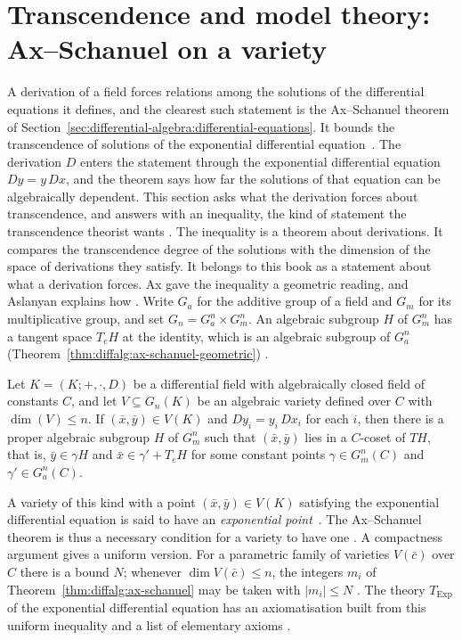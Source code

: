 \section{Transcendence and model theory: Ax--Schanuel on a variety}\label{sec:differential-algebra:transcendence}

A derivation of a field forces relations among the solutions of the differential
equations it defines, and the clearest such statement is the Ax--Schanuel
theorem of Section~\ref{sec:differential-algebra:differential-equations}. It
bounds the transcendence of solutions of the exponential differential equation~\cite[Theorem~2.2, p.~6]{Aslanyan2018}.
The derivation $D$ enters the statement through the exponential
differential equation $Dy=y\,Dx$, and the theorem says how far the solutions of
that equation can be algebraically dependent. This section asks what the
derivation forces about transcendence, and answers with an inequality, the kind
of statement the transcendence theorist wants
\cite[\S2]{Aslanyan2018}. The inequality is a theorem about derivations. It
compares the transcendence degree of the solutions with the dimension of the
space of derivations they satisfy. It belongs to this book as a statement
about what a derivation forces.
Ax \cite{Ax1971} gave the inequality a geometric reading, and Aslanyan
explains how \cite[\S2, p.~5]{Aslanyan2018}. Write $G_a$ for the additive
group of a field and $G_m$ for its multiplicative group, and set
$G_n=G_a^n\times G_m^n$. An algebraic subgroup $H$ of $G_m^n$ has a tangent
space $T_eH$ at the identity, which is an algebraic subgroup of $G_a^n$ (Theorem~\ref{thm:diffalg:ax-schanuel-geometric})
\cite[\S2, p.~6]{Aslanyan2018}.\begin{theorem}\label{thm:diffalg:ax-schanuel-geometric}
Let $K=(K;+,\cdot,D)$ be a differential field with algebraically closed
field of constants $C$, and let $V\subseteq G_n(K)$ be an algebraic variety
defined over $C$ with $\dim(V)\leq n$. If $(\bar{x},\bar{y})\in V(K)$ and
$Dy_i=y_i\,Dx_i$ for each $i$, then there is a proper algebraic subgroup $H$
of $G_m^n$ such that $(\bar{x},\bar{y})$ lies in a $C$-coset of $TH$, that
is, $\bar{y}\in\gamma H$ and $\bar{x}\in\gamma'+T_eH$ for some constant
points $\gamma\in G_m^n(C)$ and $\gamma'\in G_a^n(C)$.
\end{theorem}

A variety of this kind with a point $(\bar{x},\bar{y})\in V(K)$ satisfying
the exponential differential equation is said to have an \emph{exponential
point}~\cite[\S2, pp.~6--7]{Aslanyan2018}. The Ax--Schanuel theorem is thus a necessary condition for a variety
to have one \cite[\S2, p.~6]{Aslanyan2018}. A compactness argument gives a
uniform version. For a parametric family of varieties $V(\bar{c})$ over $C$
there is a bound $N$; whenever $\dim V(\bar{c})\leq n$, the integers $m_i$
of Theorem~\ref{thm:diffalg:ax-schanuel} may be taken with $|m_i|\leq N$
\cite[\S2, p.~6]{Aslanyan2018}. The theory $T_{\mathrm{Exp}}$ of the
exponential differential equation has an axiomatisation built from this
uniform inequality and a list of elementary axioms
\cite[\S2, pp.~6--7]{Aslanyan2018}.

